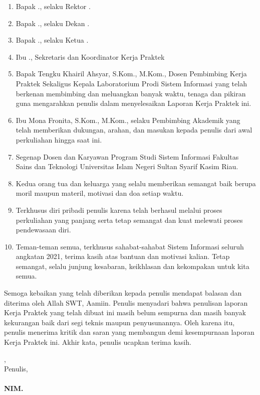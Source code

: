 \begin{enumerate}
	\item Bapak \rektor., selaku Rektor \universitas.
	\item Bapak \dekan., selaku Dekan \fakultas.
	\item Bapak \kaprodi., selaku Ketua \programStudi \space
	      \fakultas \space \universitas.
	\item Ibu \sekretarisprodi., Sekretaris dan Koordinator Kerja Praktek \programStudi \space
	      \fakultas \space \universitas
	\item Bapak Tengku Khairil Ahsyar, S.Kom., M.Kom., Dosen Pembimbing Kerja Praktek Sekaligus Kepala Laboratorium Prodi Sistem Informasi yang telah berkenan membimbing dan meluangkan banyak waktu, tenaga dan pikiran guna mengarahkan penulis dalam menyelesaikan Laporan Kerja Praktek ini.
	\item Ibu Mona Fronita, S.Kom., M.Kom., selaku Pembimbing Akademik yang telah memberikan dukungan, arahan, dan masukan kepada penulis dari awal perkuliahan hingga saat ini.
	\item Segenap Dosen dan Karyawan Program Studi Sistem Informasi Fakultas Sains dan Teknologi Universitas Islam Negeri Sultan Syarif Kasim Riau.
	\item Kedua orang tua dan keluarga yang selalu memberikan semangat baik berupa moril maupun materil, motivasi dan doa setiap waktu.
	\item Terkhusus diri pribadi penulis karena telah berhasul melalui proses perkuliahan yang panjang serta tetap semangat dan kuat melewati proses pendewasaan diri.
	\item Teman-teman semua, terkhusus sahabat-sahabat Sistem Informasi seluruh angkatan 2021, terima kasih atas bantuan dan motivasi kalian. Tetap semangat, selalu junjung kesabaran, keikhlasan dan kekompakan untuk kita semua.

\end{enumerate}

Semoga kebaikan yang telah diberikan kepada penulis mendapat balasan dan diterima oleh Allah SWT, Aamiin. Penulis menyadari bahwa penulisan laporan Kerja Praktek yang telah dibuat ini masih belum sempurna dan masih banyak kekurangan baik dari segi teknis maupun penyusunannya. Oleh karena itu, penulis menerima kritik dan saran yang membangun demi kesempurnaan laporan Kerja Praktek ini. Akhir kata, penulis ucapkan terima kasih.

\vspace*{0.1cm}

\begin{flushright}
	\kota, \tanggalPersetujuan\\
	Penulis,\\
	\vspace{2cm}
	\textbf{\underline{\penulis}\\
		NIM. \nim}

\end{flushright}

